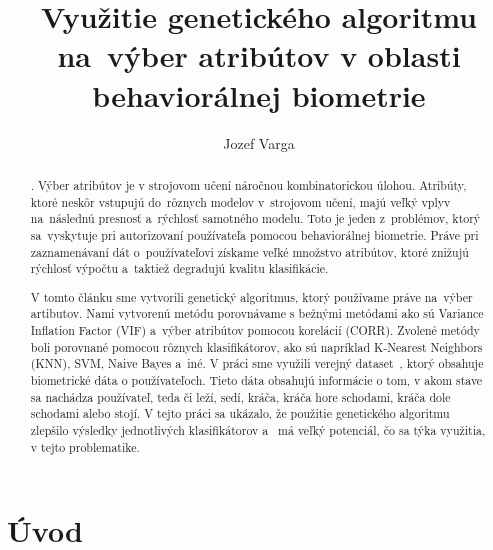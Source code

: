 \documentclass[runningheads]{llncs}
\newcommand\tab[1][0.5cm]{\hspace*{#1}}
\begin{document}
%
\title{Využitie genetického algoritmu na~výber atribútov v oblasti behaviorálnej biometrie}
%
%
\author{Jozef Varga}
%
%
\maketitle              %
%
\begin{abstract}
    . Výber atribútov je v strojovom učení náročnou kombinatorickou úlohou. 
    Atribúty, ktoré neskôr vstupujú do~rôznych modelov v~strojovom učení, majú
    veľký vplyv na~následnú presnosť a~rýchlosť samotného modelu. Toto je jeden z~problémov,
    ktorý sa~vyskytuje pri autorizovaní používateľa pomocou behaviorálnej biometrie. Práve pri
    zaznamenávaní dát o~používateľovi získame veľké množstvo atribútov, ktoré znižujú rýchlosť výpočtu
    a~taktiež degradujú kvalitu klasifikácie. 
    
    \tab V tomto článku sme vytvorili genetický algoritmus, ktorý používame práve na~výber artibutov. Nami vytvorenú
    metódu porovnávame s bežnými metódami ako sú Variance Inflation Factor (VIF) a~výber atribútov pomocou korelácií (CORR). 
    Zvolené metódy boli porovnané pomocou rôznych klasifikátorov, ako sú napríklad K-Nearest Neighbors (KNN), SVM, Naive Bayes a~iné. 
    V práci sme využili verejný dataset~\cite{ref_dataset_anguita,ref_dataset}, ktorý obsahuje biometrické dáta o 
    používateľoch. Tieto dáta obsahujú informácie o tom, v akom stave sa nachádza používateľ, teda či leží, sedí, 
    kráča,  kráča hore schodami, kráča dole schodami alebo stojí.
    V tejto práci sa ukázalo, že použitie genetického algoritmu zlepšilo výsledky jednotlivých klasifikátorov a~
    má veľký potenciál, čo sa týka využitia, v tejto problematike.

\end{abstract}
%

\section{Úvod}
\end{document}
